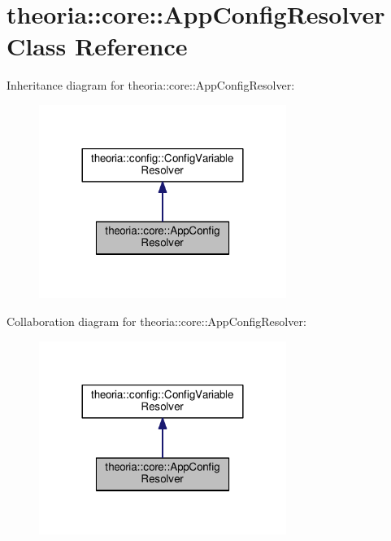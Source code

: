\hypertarget{classtheoria_1_1core_1_1AppConfigResolver}{\section{theoria\+:\+:core\+:\+:App\+Config\+Resolver Class Reference}
\label{classtheoria_1_1core_1_1AppConfigResolver}
}


Inheritance diagram for theoria\+:\+:core\+:\+:App\+Config\+Resolver\+:
\nopagebreak
\begin{figure}[H]
\begin{center}
\leavevmode
\includegraphics[width=228pt]{classtheoria_1_1core_1_1AppConfigResolver__inherit__graph}
\end{center}
\end{figure}


Collaboration diagram for theoria\+:\+:core\+:\+:App\+Config\+Resolver\+:
\nopagebreak
\begin{figure}[H]
\begin{center}
\leavevmode
\includegraphics[width=228pt]{classtheoria_1_1core_1_1AppConfigResolver__coll__graph}
\end{center}
\end{figure}
